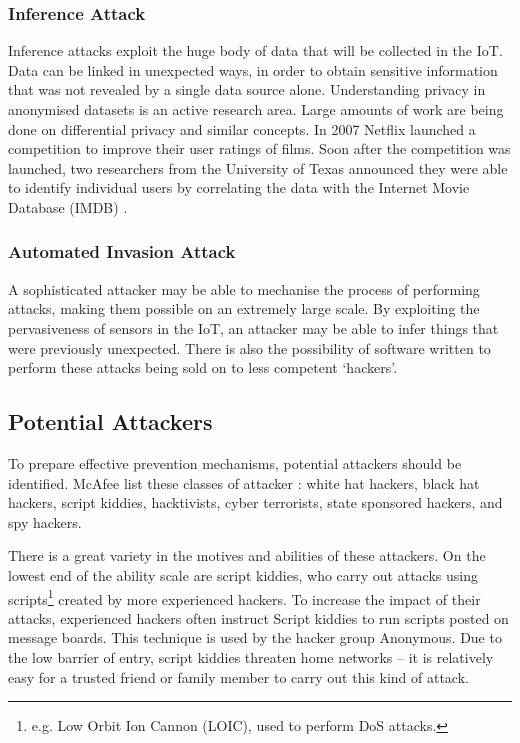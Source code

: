 \documentclass[10pt,journal,compsoc]{IEEEtran}
\begin{document}
\subsubsection{Inference Attack}
Inference attacks exploit the huge body of data that will be collected in the
IoT. Data can be linked in unexpected ways, in order to obtain sensitive
information that was not revealed by a single data source alone. Understanding
privacy in anonymised datasets is an active research area. Large amounts of
work are being done on differential privacy and similar concepts. In 2007
Netflix launched a competition to improve their user ratings of films. Soon
after the competition was launched, two researchers from the University of
Texas announced they were able to identify individual users by correlating the
data with the Internet Movie Database (IMDB) \cite{Narayanan2008}.

\subsubsection{Automated Invasion Attack}
A sophisticated attacker may be able to mechanise the process of performing
attacks, making them possible on an extremely large scale. By exploiting the
pervasiveness of sensors in the IoT, an attacker may be able to infer things
that were previously unexpected. There is also the possibility of software
written to perform these attacks being sold on to less competent `hackers'. 

\subsection{Potential Attackers}
To prepare effective prevention mechanisms, potential attackers should be
identified. McAfee list these classes of attacker \cite{McAfee2011}:
white hat hackers, black hat hackers, script kiddies, hacktivists, cyber
terrorists, state sponsored hackers, and spy hackers. 

There is a great variety in the motives and abilities of these attackers. On
the lowest end of the ability scale are script kiddies, who carry out attacks
using scripts\footnote{e.g. Low Orbit Ion Cannon (LOIC), used to perform DoS
attacks.} created by more experienced hackers. To increase the impact of their
attacks, experienced hackers often instruct Script kiddies to run scripts
posted on message boards. This technique is used by the hacker group Anonymous.
Due to the low barrier of entry, script kiddies threaten home networks -- it is
relatively easy for a trusted friend or family member to carry out this kind of
attack. 
\end{document}
